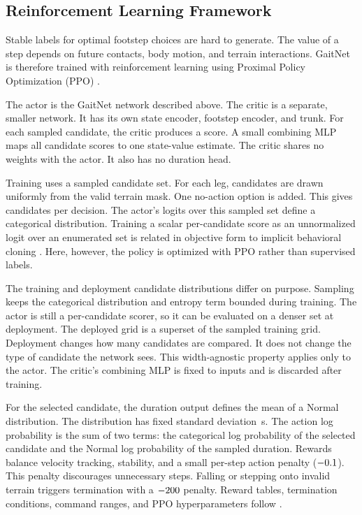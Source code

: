 \subsection{Reinforcement Learning Framework}
\label{subsec:methodology-gaitnet-training}

Stable labels for optimal footstep choices are hard to generate. The
value of a step depends on future contacts, body motion, and terrain
interactions. GaitNet is therefore trained with reinforcement learning
using Proximal Policy Optimization (PPO)
\cite{Schulman_proximal_2017}.

The actor is the GaitNet network described above. The critic is a
separate, smaller network. It has its own state encoder, footstep
encoder, and trunk. For each sampled candidate,
the critic produces a score. A small combining MLP maps all
\corlTrainTotalCandidates{} candidate scores to one state-value
estimate. The critic shares no weights with the actor. It also has no
duration head.

Training uses a sampled candidate set. For each leg,
\numberstringnum{\corlTrainCandidatesPerLeg} candidates are drawn
uniformly from the valid terrain mask. One no-action option is added.
This gives \corlTrainTotalCandidates{} candidates per decision. The
actor's logits over this sampled set define a categorical
distribution. Training a scalar per-candidate score as an unnormalized
logit over an enumerated set is related in objective form to implicit
behavioral cloning \cite{florence_implicit_2021}. Here, however, the
policy is optimized with PPO rather than supervised labels.

The training and deployment candidate distributions differ on purpose.
Sampling keeps the categorical distribution and entropy term bounded
during training. The actor is still a per-candidate scorer, so it can
be evaluated on a denser set at deployment. The deployed grid is a
superset of the sampled training grid. Deployment changes how many
candidates are compared. It does not change the type of candidate the
network sees. This width-agnostic property applies only to the actor.
The critic's combining MLP is fixed to
\corlTrainTotalCandidates{} inputs and is discarded after training.

For the selected candidate, the duration output defines the mean of a
Normal distribution. The distribution has fixed standard deviation
\corlDurationExploreStd\,s. The action log probability is the sum of
two terms: the categorical log probability of the selected candidate
and the Normal log probability of the sampled duration. Rewards
balance velocity tracking, stability, and a small per-step action
penalty ($-0.1$). This penalty discourages unnecessary
steps. Falling or stepping onto invalid terrain triggers termination
with a $-200$ penalty. Reward tables, termination
conditions, command ranges, and PPO hyperparameters follow
\cite{Sullivan2025}.

